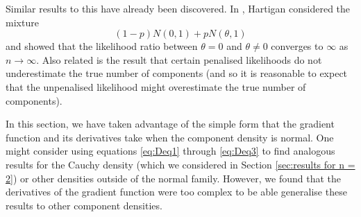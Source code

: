 		Similar results to this have already been discovered. In \cite{Hartigan1985-wn}, Hartigan considered the mixture 
		\begin{equation}
			(1 - p)N(0,1) + pN(\theta, 1)
		\end{equation}
		and showed that the likelihood ratio between $\theta = 0$ and $\theta \neq 0$ converges to $\infty$ as $n \rightarrow \infty$. Also related is the result \cite{Leroux1992-ek} that certain penalised likelihoods do not underestimate the true number of components (and so it is reasonable to expect that the unpenalised likelihood might overestimate the true number of components).


		In this section, we have taken advantage of the simple form that the gradient function and its derivatives take when the component density is normal. One might consider using equations \eqref{eq:Deq1} through \eqref{eq:Deq3} to find analogous results for the Cauchy density (which we considered in Section \ref{sec:results for n = 2}) or other densities outside of the normal family. However, we found that the derivatives of the gradient function were too complex to be able generalise these results to other component densities.





